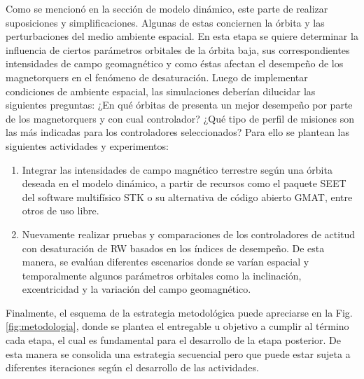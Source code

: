 Como se mencionó en la sección de modelo dinámico, este parte de realizar suposiciones y simplificaciones. Algunas de estas conciernen la órbita y las perturbaciones del medio ambiente espacial. En esta etapa se quiere determinar la influencia de ciertos parámetros orbitales de la órbita baja, sus correspondientes intensidades de campo geomagnético y como éstas afectan el desempeño de los magnetorquers en el fenómeno de desaturación.  
Luego de implementar condiciones de ambiente espacial, las simulaciones deberían dilucidar las siguientes preguntas: ¿En qué órbitas de presenta un mejor desempeño por parte de los magnetorquers y con cual controlador? ¿Qué tipo de perfil de misiones son las más indicadas para los controladores seleccionados? Para ello se plantean las siguientes actividades y experimentos:
\begin{enumerate}[label=\alph*)]
	
	\item	Integrar las intensidades de campo magnético terrestre según una órbita deseada en el modelo dinámico, a partir de recursos como el paquete SEET del software multifísico STK o su alternativa de código abierto GMAT, entre otros de uso libre. 
	\item	Nuevamente realizar pruebas y comparaciones de los controladores de actitud con desaturación de RW basados en los índices de desempeño. De esta manera, se evalúan diferentes escenarios donde se varían espacial y temporalmente algunos parámetros orbitales como la inclinación, excentricidad y la variación del campo geomagnético.
	
	
\end{enumerate}

Finalmente, el esquema de la estrategia metodológica puede apreciarse en la Fig.\ref{fig:metodologia}, donde se plantea el entregable u objetivo a cumplir al término cada etapa, el cual es fundamental para el desarrollo de la etapa posterior. De esta manera se consolida una estrategia secuencial pero que puede estar sujeta a diferentes iteraciones según el desarrollo de las actividades.


